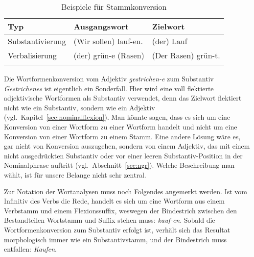 \begin{table}[!htbp]
  \centering
  \caption{Beispiele für Wortformenkonversion}
  \label{tab:wfkonv}
\end{table}

\begin{table}[!htbp]
  \centering
  \begin{tabular}{lll}
    \lsptoprule
    \textbf{Typ} & \textbf{Ausgangswort} & \textbf{Zielwort} \\
    \midrule
    Substantivierung & (Wir sollen) lauf-en. & (der) Lauf \\
    Verbalisierung & (der) grün-e (Rasen) & (Der Rasen) grün-t.\\
    \lspbottomrule
  \end{tabular}
  \caption{Beispiele für Stammkonversion}
  \label{tab:stammkonv}
\end{table}

Die Wortformenkonversion vom Adjektiv \textit{gestrichen-e} zum Substantiv \textit{Gestrichenes} ist eigentlich ein Sonderfall.
Hier wird eine voll flektierte adjektivische Wortformen als Substantiv verwendet, denn das Zielwort flektiert nicht wie ein Substantiv, sondern wie ein Adjektiv (vgl.\ Kapitel~\ref{sec:nominalflexion}).
Man könnte sagen, dass es sich um eine Konversion von einer Wortform zu einer Wortform handelt und nicht um eine Konversion von einer Wortform zu einem Stamm.
Eine andere Lösung wäre es, gar nicht von Konversion auszugehen, sondern von einem Adjektiv, das mit einem nicht ausgedrückten Substantiv oder vor einer leeren Substantiv-Position in der Nominalphrase auftritt (vgl.\ Abschnitt~\ref{sec:ngr}).
Welche Beschreibung man wählt, ist für unsere Belange nicht sehr zentral.

Zur Notation der Wortanalysen muss noch Folgendes angemerkt werden.
Ist vom Infinitiv des Verbs die Rede, handelt es sich um eine Wortform aus einem Verbstamm und einem Flexionssuffix, weswegen der Bindestrich zwischen den Bestandteilen Wortstamm und Suffix stehen muss: \textit{kauf-en}.
Sobald die Wortformenkonversion zum Substantiv erfolgt ist, verhält sich das Resultat morphologisch immer wie ein Substantivstamm, und der Bindestrich muss entfallen: \textit{Kaufen}.

